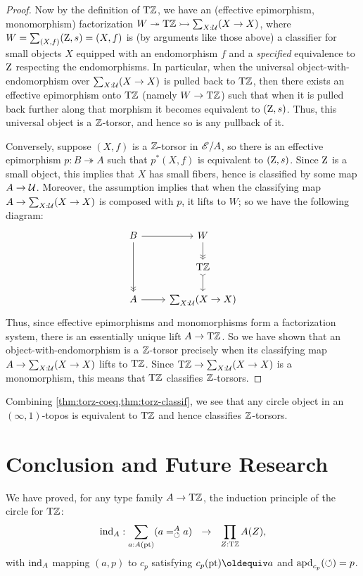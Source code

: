 \documentclass[a4paper,12pt]{amsart}
\begin{document}
\begin{proof}
Now by the definition of ${\mathrm{T}\mathbb{Z}}$, we have an (effective epimorphism, monomorphism) factorization $W \twoheadrightarrow {\mathrm{T}\mathbb{Z}} \rightarrowtail \sum_{X:\mathcal{U}} (X\to X)$, where $W = \sum_{(X,f)} (\mathrm{Z},s)=(X,f)$ is (by arguments like those above) a classifier for small objects $X$ equipped with an endomorphism $f$ and a \emph{specified} equivalence to $\mathrm{Z}$ respecting the endomorphisms.
In particular, when the universal object-with-endomorphism over $\sum_{X:\mathcal{U}} (X\to X)$ is pulled back to ${\mathrm{T}\mathbb{Z}}$, then there exists an effective epimorphism onto ${\mathrm{T}\mathbb{Z}}$ (namely $W\to {\mathrm{T}\mathbb{Z}}$) such that when it is pulled back further along that morphism it becomes equivalent to $(\mathrm{Z},s)$.
Thus, this universal object is a $\mathbb{Z}$-torsor, and hence so is any pullback of it.

Conversely, suppose $(X,f)$ is a $\mathbb{Z}$-torsor in $\mathscr{E}/A$, so there is an effective epimorphism $p:B\twoheadrightarrow A$ such that $p^*(X,f)$ is equivalent to $(\mathrm{Z},s)$.
Since $\mathrm{Z}$ is a small object, this implies that $X$ has small fibers, hence is classified by some map $A\to \mathcal{U}$.
Moreover, the assumption implies that when the classifying map $A\to \sum_{X:\mathcal{U}} (X\to X)$ is composed with $p$, it lifts to $W$; so we have the following diagram:
\[
\begin{tikzcd}
  B \ar[dd,->>] \ar[r] & W \ar[d,->>] \\
  & \TorZ \ar[d,>->] \\
  A \ar[r] & \sum_{X:\UU} (X\to X)
\end{tikzcd}
\]
Thus, since effective epimorphisms and monomorphisms form a factorization system, there is an essentially unique lift $A\to {\mathrm{T}\mathbb{Z}}$.
So we have shown that an object-with-endomorphism is a $\mathbb{Z}$-torsor precisely when its classifying map $A\to \sum_{X:\mathcal{U}} (X\to X)$ lifts to ${\mathrm{T}\mathbb{Z}}$.
Since ${\mathrm{T}\mathbb{Z}} \to \sum_{X:\mathcal{U}} (X\to X)$ is a monomorphism, this means that ${\mathrm{T}\mathbb{Z}}$ classifies $\mathbb{Z}$-torsors.
\end{proof}

Combining \cref{thm:torz-coeq,thm:torz-classif}, we see that any circle object in an $(\infty,1)$-topos is equivalent to ${\mathrm{T}\mathbb{Z}}$ and hence classifies $\mathbb{Z}$-torsors.


\section{Conclusion and Future Research}\label{sec:conclusion}
We have proved, {for any type family $A\to{\mathrm{T}\mathbb{Z}}$,}
the induction principle of the circle for ${\mathrm{T}\mathbb{Z}}$:
\[
{\mathop{\mathrm{ind}}}_A : \sum_{a:A({\mathord{\mathrm{pt}}})}(a=^A_{\circlearrowleft} a) ~~\to~~ \prod_{Z:{\mathrm{T}\mathbb{Z}}} A(Z),
\]
with ${\mathop{\mathrm{ind}}}_A$ mapping $(a,p)$ to $c_p$ satisfying $c_p(\pt) \jdeq a$
and $\mathop{{\mathrm{apd}}_{c_p}}({\circlearrowleft}) = p$.
\end{document}
